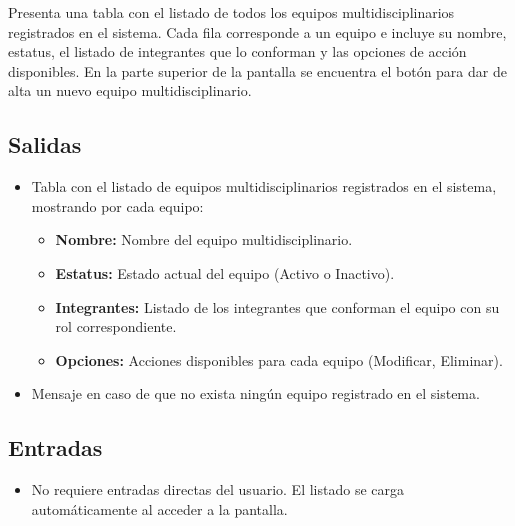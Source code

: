 Presenta una tabla con el listado de todos los equipos 
multidisciplinarios registrados en el sistema. Cada fila corresponde 
a un equipo e incluye su nombre, estatus, el listado de integrantes 
que lo conforman y las opciones de acción disponibles. En la parte 
superior de la pantalla se encuentra el botón 
 para dar de alta un nuevo equipo 
multidisciplinario.


\subsection{Salidas}
\begin{itemize}
	\item Tabla con el listado de equipos multidisciplinarios 
	registrados en el sistema, mostrando por cada equipo:
	\begin{itemize}
		\item \textbf{Nombre:} Nombre del equipo multidisciplinario.
		\item \textbf{Estatus:} Estado actual del equipo 
		(Activo o Inactivo).
		\item \textbf{Integrantes:} Listado de los integrantes 
		que conforman el equipo con su rol correspondiente.
		\item \textbf{Opciones:} Acciones disponibles para cada 
		equipo (Modificar, Eliminar).
	\end{itemize}
	\item Mensaje  en caso 
	de que no exista ningún equipo registrado en el sistema.
\end{itemize}

\subsection{Entradas}
\begin{itemize}
	\item No requiere entradas directas del usuario. El listado 
	se carga automáticamente al acceder a la pantalla.
\end{itemize}

